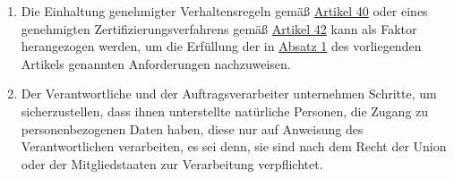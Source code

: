 \begin{enumerate}
  \item Die Einhaltung genehmigter Verhaltensregeln gemäß \hyperref[ch:40]{Artikel 40} oder eines genehmigten
   Zertifizierungsverfahrens gemäß \hyperref[ch:42]{Artikel 42} kann als Faktor herangezogen werden, um die Erfüllung
   der in \hyperref[itm:32-1]{Absatz 1} des vorliegenden Artikels genannten Anforderungen nachzuweisen.
  \label{itm:32-3}

  \item Der Verantwortliche und der Auftragsverarbeiter unternehmen Schritte, um sicherzustellen, dass ihnen
   unterstellte natürliche Personen, die Zugang zu personenbezogenen Daten haben, diese nur auf Anweisung des
   Verantwortlichen verarbeiten, es sei denn, sie sind nach dem Recht der Union oder der Mitgliedstaaten zur
   Verarbeitung verpflichtet.
  \label{itm:32-4}

\end{enumerate}


